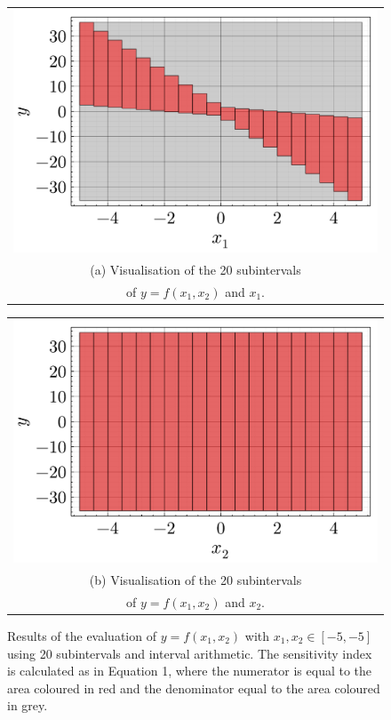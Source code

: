 \documentclass[twocolumn]{rps-esrel2022}
\begin{document}
\begin{figure}
	\centering
	\begin{tabular}{@{}c@{}}
	  \includegraphics[width=\linewidth]{figures/example_boxes_1.pdf} \\[\abovecaptionskip]
	  \small (a) Visualisation of the 20 subintervals\\
	  of $y=f(x_1,x_2)$ and $x_1$.
	\end{tabular}

	\vspace{\floatsep}

	\begin{tabular}{@{}c@{}}
	  \includegraphics[width=\linewidth]{figures/example_boxes_2.pdf} \\[\abovecaptionskip]
	  \small (b) Visualisation of the 20 subintervals\\
	  of $y=f(x_1,x_2)$ and $x_2$.
	\end{tabular}

	\caption{Results of the evaluation of $y=f(x_1,x_2)$ with $x_1,x_2 \in [-5,-5]$ using 20 subintervals and interval arithmetic.
	The sensitivity index is calculated as in Equation 1, where the numerator is equal to the area coloured in red and the denominator
	equal to the area coloured in grey.}
	\label{fig:myfig}
\end{figure}
\end{document}
